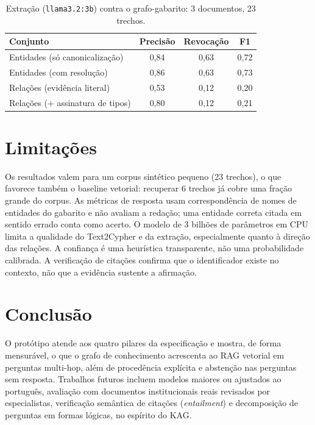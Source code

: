 \documentclass[12pt]{article}
\begin{document}
\begin{table}[ht]
\centering
\caption{Extração (\texttt{llama3.2:3b}) contra o grafo-gabarito: 3 documentos, 23 trechos.}
\label{tab:extracao}
\small
\begin{tabular}{lccc}
\toprule
Conjunto & Precisão & Revocação & F1 \\
\midrule
Entidades (só canonicalização)        & 0,84 & 0,63 & 0,72 \\
Entidades (com resolução)             & 0,86 & 0,63 & 0,73 \\
Relações (evidência literal)          & 0,53 & 0,12 & 0,20 \\
Relações (+ assinatura de tipos)      & 0,80 & 0,12 & 0,21 \\
\bottomrule
\end{tabular}
\end{table}



\section{Limitações}

Os resultados valem para um corpus sintético pequeno (23 trechos), o que favorece também
o baseline vetorial: recuperar 6 trechos já cobre uma fração grande do corpus. As
métricas de resposta usam correspondência de nomes de entidades do gabarito e não
avaliam a redação; uma entidade correta citada em sentido errado conta como acerto.
O modelo de 3 bilhões de parâmetros em CPU limita a qualidade do Text2Cypher e da
extração, especialmente quanto à direção das relações. A confiança é uma heurística
transparente, não uma probabilidade calibrada. A verificação de citações confirma que o
identificador existe no contexto, não que a evidência sustente a afirmação.

\section{Conclusão}

O protótipo atende aos quatro pilares da especificação e mostra, de forma mensurável, o
que o grafo de conhecimento acrescenta ao RAG vetorial em perguntas multi-hop, além de
procedência explícita e abstenção nas perguntas sem resposta. Trabalhos futuros incluem
modelos maiores ou ajustados ao português, avaliação com documentos institucionais
reais revisados por especialistas, verificação semântica de citações (\emph{entailment})
e decomposição de perguntas em formas lógicas, no espírito do KAG.


\end{document}
